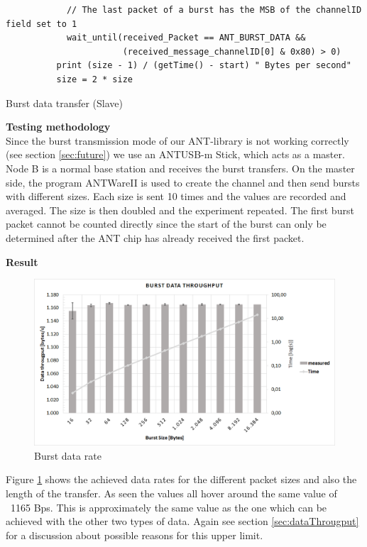 \begin{description}
\begin{code}[H]
\begin{verbatim}
		    // The last packet of a burst has the MSB of the channelID field set to 1
		    wait_until(received_Packet == ANT_BURST_DATA && 
		               (received_message_channelID[0] & 0x80) > 0)		    
		  print (size - 1) / (getTime() - start) " Bytes per second"
		  size = 2 * size
		\end{verbatim}
		\caption{Burst data transfer (Slave)}\label{lst:sExp5}
	\end{code}
	\item{\textbf{Testing methodology}} \hfill \\ Since the burst transmission mode of our ANT-library is not working correctly (see section \ref{sec:future}) we use an ANTUSB-m Stick, which acts as a master. Node B is a normal base station and receives the burst transfers. On the master side, the program ANTWareII \cite{ANTwareII} is used to create the channel and then send bursts with different sizes. Each size is sent 10 times and the values are recorded and averaged. The size is then doubled and the experiment repeated. The first burst packet cannot be counted directly since the start of the burst can only be determined after the ANT chip has already received the first packet.
	\item{\textbf{Result}} \hfill \\ 
	\begin{figure}[H]
		\centering
		\includegraphics[scale=0.5]{content/images/exp5.png}
		\caption{Burst data rate}\label{fig:exp5}
	\end{figure}
	Figure \ref{fig:exp5} shows the achieved data rates for the different packet sizes and also the length of the transfer. As seen the values all hover around the same value of ~1165 Bps. This is approximately the same value as the one which can be achieved with the other two types of data.
	Again see section \ref{sec:dataThrougput} for a discussion about possible reasons for this upper limit. 
\end{description}
\newpage

